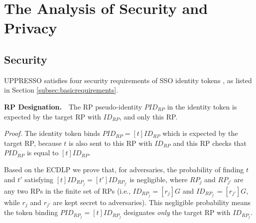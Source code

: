 \section{The Analysis of Security and Privacy}
\label{sec:analysis}


\subsection{Security}
\label{analysis-security}
UPPRESSO satisfies four security requirements of SSO identity tokens \cite{ArmandoCCCT08,FettKS16, FettKS17},
     as listed in Section \ref{subsec:basicrequirements}.

\vspace{1mm}
\noindent\textbf{RP Designation.}~~The RP pseudo-identity $PID_{RP}$ in the identity token
     is expected by the target RP with $ID_{RP}$, and only this RP.

\vspace{0.5mm}
\noindent\emph{Proof.} 
The identity token binds $PID_{RP} = [t]ID_{RP}$ which is expected by the target RP,
    because $t$ is also sent to this RP with $ID_{RP}$
     and this RP checks that $PID_{RP}$ is equal to $[t]ID_{RP}$.


Based on the ECDLP
    we prove that,
    for adversaries,
        the probability of finding $t$ and $t'$
    satisfying $[t]ID_{RP_j} = [t']ID_{RP_{j'}}$ is negligible,
    where $RP_j$ and $RP_{j'}$ are any two RPs in the finite set of RPs (i.e.,
    $ID_{RP_j} = [r_j]G$ and $ID_{RP_{j'}} = [r_{j'}]G$, while $r_j$ and $r_{j'}$ are kept secret to adversaries).
This negligible probability means the token binding $PID_{RP_j} = [t]ID_{RP_j}$ designates \emph{only} the target RP with $ID_{RP_j}$.

